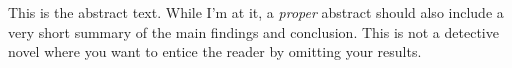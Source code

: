 This is the abstract text. While I'm at it, a \textit{proper} abstract should
also include a very short summary of the main findings and conclusion. This is
not a detective novel where you want to entice the reader by
omitting your results.
